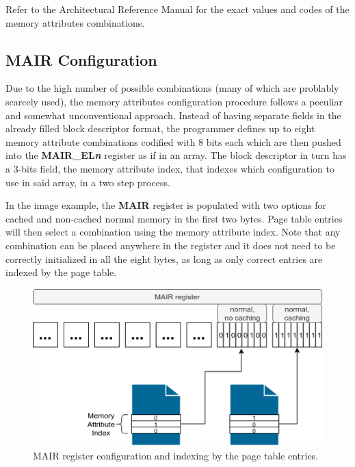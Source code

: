 \documentclass[12pt,a4paper,openright,twoside]{report}
\begin{document}
Refer to the Architectural Reference Manual \cite{armarm} for the exact values
and codes of the memory attributes combinations.

\subsection{MAIR Configuration}
Due to the high number of possible combinations (many of which are problably 
scarcely used), the memory attributes 
configuration procedure follows a peculiar and somewhat unconventional approach.
Instead of having separate
fields in the already filled block descriptor format, the programmer defines
up to eight memory attribute combinations codified with 8 bits each which are 
then pushed into the \textbf{MAIR\_EL\textit{n}} register as if in an array.
The block descriptor in turn has a 3-bits field, the memory attribute index,
 that indexes which configuration to use in said array, in a two step process.

 In the image example, the \textbf{MAIR} register is populated with two options
 for cached and non-cached normal memory in the first two bytes. Page table entries
 will then select a combination using the memory attribute index.
 Note that any combination can be placed anywhere in the register and it does not
 need to be correctly initialized in all the eight bytes, as long as only correct
 entries are indexed by the page table.

 \begin{figure}[h]
    \begin{center}
 \includegraphics[scale=0.7]{images/tesi17.png} 
 \caption[MAIR Register]{MAIR register configuration and indexing by the page
 table entries.}\label{fig:mair}
    \end{center}
 \end{figure}
\end{document}

